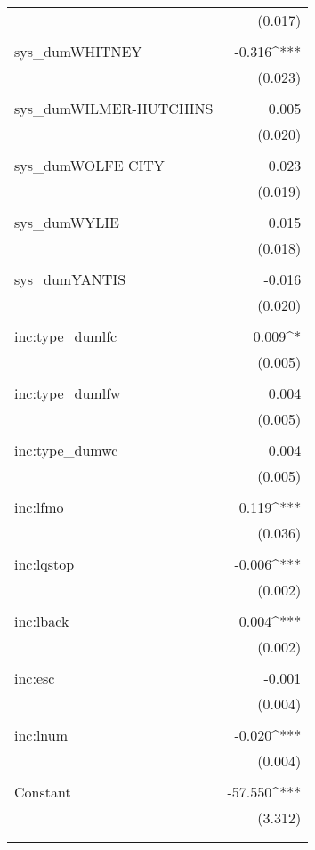 \begin{table}[!htbp]
\begin{tabular}{@{\extracolsep{5pt}}lD{.}{.}{-3} }
  & (0.017) \\ 
  & \\ 
 sys\_dumWHITNEY & -0.316^{***} \\ 
  & (0.023) \\ 
  & \\ 
 sys\_dumWILMER-HUTCHINS & 0.005 \\ 
  & (0.020) \\ 
  & \\ 
 sys\_dumWOLFE CITY & 0.023 \\ 
  & (0.019) \\ 
  & \\ 
 sys\_dumWYLIE & 0.015 \\ 
  & (0.018) \\ 
  & \\ 
 sys\_dumYANTIS & -0.016 \\ 
  & (0.020) \\ 
  & \\ 
 inc:type\_dumlfc & 0.009^{*} \\ 
  & (0.005) \\ 
  & \\ 
 inc:type\_dumlfw & 0.004 \\ 
  & (0.005) \\ 
  & \\ 
 inc:type\_dumwc & 0.004 \\ 
  & (0.005) \\ 
  & \\ 
 inc:lfmo & 0.119^{***} \\ 
  & (0.036) \\ 
  & \\ 
 inc:lqstop & -0.006^{***} \\ 
  & (0.002) \\ 
  & \\ 
 inc:lback & 0.004^{***} \\ 
  & (0.002) \\ 
  & \\ 
 inc:esc & -0.001 \\ 
  & (0.004) \\ 
  & \\ 
 inc:lnum & -0.020^{***} \\ 
  & (0.004) \\ 
  & \\ 
 Constant & -57.550^{***} \\ 
  & (3.312) \\ 
  & \\ 
\hline \\[-1.8ex] 

\end{tabular}
\end{table}
